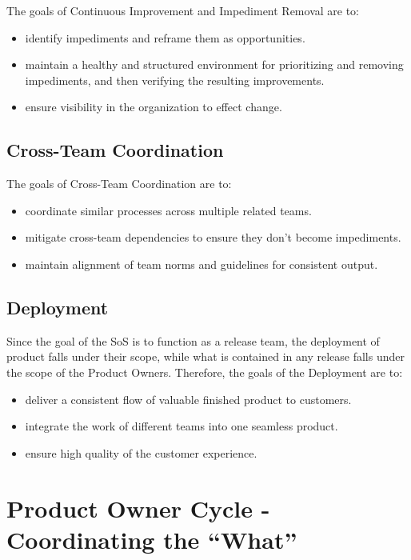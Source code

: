 \documentclass[12pt,a4paper,parskip=full]{scrartcl}
\begin{document}
The goals of Continuous Improvement and Impediment Removal are to:

\begin{itemize}
	\item identify impediments and reframe them as opportunities.
	\item maintain a healthy and structured environment for prioritizing and removing impediments, and then verifying the resulting improvements.
	\item ensure visibility in the organization to effect change.
\end{itemize}

\subsection{Cross-Team Coordination}

The goals of Cross-Team Coordination are to:

\begin{itemize}
	\item coordinate similar processes across multiple related teams.
	\item mitigate cross-team dependencies to ensure they don't become impediments.
	\item maintain alignment of team norms and guidelines for consistent output.
\end{itemize}

\subsection{Deployment}

Since the goal of the SoS is to function as a release team, the deployment of product falls under their scope, while what is contained in any release falls under the scope of the Product Owners. Therefore, the goals of the Deployment are to:

\begin{itemize}
	\item deliver a consistent flow of valuable finished product to customers.
	\item integrate the work of different teams into one seamless product.
	\item ensure high quality of the customer experience.
\end{itemize}

\section{Product Owner Cycle - Coordinating the ``What''}
\end{document}
